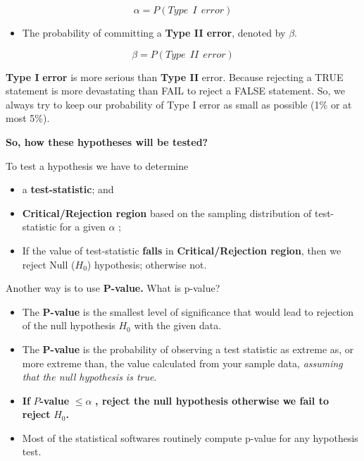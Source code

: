 \documentclass[
  11pt,
  letterpaper,
  DIV=11,
  numbers=noendperiod]{scrreprt}
\providecommand{\tightlist}{%
  \setlength{\itemsep}{0pt}\setlength{\parskip}{0pt}}
\begin{document}
\[\alpha= P(Type \ \ I \ \ error)\]

\begin{itemize}
\tightlist
\item
  The probability of committing a \textbf{Type II error}, denoted by
  \(\beta\).
\end{itemize}

\[\beta =P(Type \ \ II \ \ error)\]

\begin{tcolorbox}[enhanced jigsaw, bottomrule=.15mm, toprule=.15mm, title=\textcolor{quarto-callout-important-color}{\faExclamation}\hspace{0.5em}{Note}, bottomtitle=1mm, colframe=quarto-callout-important-color-frame, coltitle=black, rightrule=.15mm, toptitle=1mm, colbacktitle=quarto-callout-important-color!10!white, titlerule=0mm, breakable, arc=.35mm, leftrule=.75mm, opacitybacktitle=0.6, opacityback=0, colback=white, left=2mm]

\textbf{Type I} \textbf{error} is more serious than \textbf{Type II}
error. Because rejecting a TRUE statement is more devastating than FAIL
to reject a FALSE statement. So, we always try to keep our probability
of Type I error as small as possible (1\% or at most 5\%).

\end{tcolorbox}

\textbf{So, how these hypotheses will be tested?}

To test a hypothesis we have to determine

\begin{itemize}
\item
  a \textbf{test-statistic}; and
\item
  \textbf{Critical/Rejection region} based on the sampling distribution
  of test-statistic for a given \(\alpha\) ;
\item
  If the value of test-statistic \textbf{falls} in
  \textbf{Critical/Rejection region}, then we reject Null (\(H_0\))
  hypothesis; otherwise not.
\end{itemize}

Another way is to use \textbf{P-value.} What is p-value?

\begin{itemize}
\item
  The \textbf{P-value} is the smallest level of significance that would
  lead to rejection of the null hypothesis \(H_0\) with the given data.
\item
  The \textbf{P-value} is the probability of observing a test statistic
  as extreme as, or more extreme than, the value calculated from your
  sample data, \emph{assuming that the null hypothesis is true}.
\item
  \textbf{If} \(P\)\textbf{-value} \(\le\alpha\) \textbf{, reject the
  null hypothesis otherwise we fail to reject} \(H_0\)\textbf{.}
\item
  Most of the statistical softwares routinely compute p-value for any
  hypothesis test.\\
\end{itemize}
\end{document}
